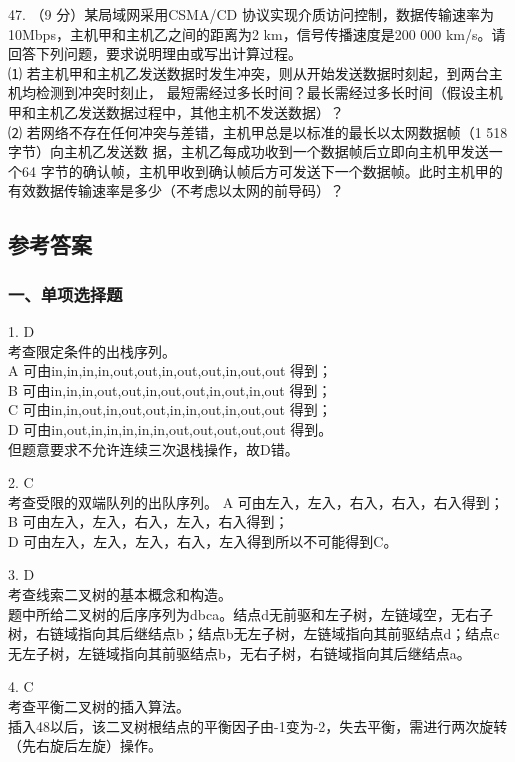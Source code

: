 47. （9 分）某局域网采用CSMA/CD 协议实现介质访问控制，数据传输速率为10Mbps，主机甲和主机乙之间的距离为2 km，信号传播速度是200 000 km/s。请回答下列问题，要求说明理由或写出计算过程。 \\
⑴ 若主机甲和主机乙发送数据时发生冲突，则从开始发送数据时刻起，到两台主机均检测到冲突时刻止，
最短需经过多长时间？最长需经过多长时间（假设主机甲和主机乙发送数据过程中，其他主机不发送数据）？ \\
⑵ 若网络不存在任何冲突与差错，主机甲总是以标准的最长以太网数据帧（1 518字节）向主机乙发送数
据，主机乙每成功收到一个数据帧后立即向主机甲发送一个64 字节的确认帧，主机甲收到确认帧后方可发送下一个数据帧。此时主机甲的有效数据传输速率是多少（不考虑以太网的前导码）？

\subsection{参考答案}
\subsubsection{一、单项选择题}

1. D \\
考查限定条件的出栈序列。 \\
A 可由in,in,in,in,out,out,in,out,out,in,out,out 得到； \\
B 可由in,in,in,out,out,in,out,out,in,out,in,out 得到； \\
C 可由in,in,out,in,out,out,in,in,out,in,out,out 得到； \\
D 可由in,out,in,in,in,in,in,out,out,out,out,out 得到。 \\
但题意要求不允许连续三次退栈操作，故D错。

2. C \\
考查受限的双端队列的出队序列。
A 可由左入，左入，右入，右入，右入得到； \\
B 可由左入，左入，右入，左入，右入得到； \\
D 可由左入，左入，左入，右入，左入得到所以不可能得到C。

3. D \\
考查线索二叉树的基本概念和构造。 \\
题中所给二叉树的后序序列为dbca。结点d无前驱和左子树，左链域空，无右子树，右链域指向其后继结点b；结点b无左子树，左链域指向其前驱结点d；结点c无左子树，左链域指向其前驱结点b，无右子树，右链域指向其后继结点a。

4. C \\
考查平衡二叉树的插入算法。 \\
插入48以后，该二叉树根结点的平衡因子由-1变为-2，失去平衡，需进行两次旋转（先右旋后左旋）操作。

